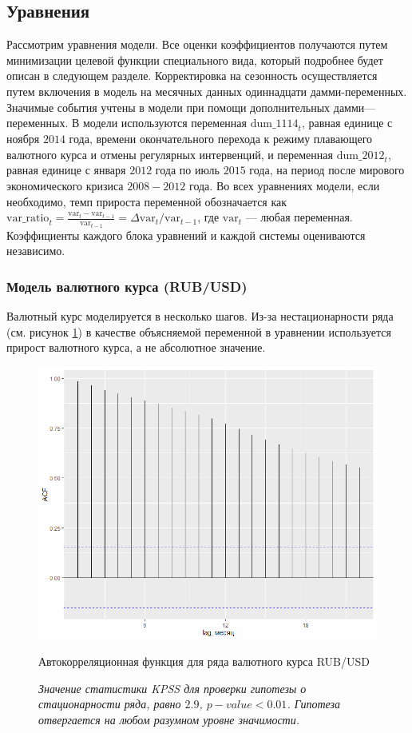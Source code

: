 \documentclass[a4paper, 14pt]{extarticle}
\begin{document}
\subsection{Уравнения}
Рассмотрим уравнения модели.
Все оценки коэффициентов получаются путем минимизации целевой функции специального вида, который подробнее будет описан в следующем разделе.
Корректировка на сезонность осуществляется путем включения в модель на месячных данных одиннадцати дамми-переменных.
Значимые события учтены в модели при помощи дополнительных дамми—переменных.
В модели используются переменная $\text{dum\_1114}_t$, равная единице с ноября $2014$ года, времени окончательного перехода к режиму плавающего валютного курса и отмены регулярных интервенций,  и переменная $\text{dum\_2012}_t$, равная единице с января $2012$ года по июль $2015$ года, на период после мирового экономического кризиса $2008-2012$ года.
Во всех уравнениях модели, если необходимо, темп прироста переменной обозначается как $\text{var\_ratio}_{t} = \frac{\text{var}_t -\text{var}_{t-1}}{\text{var}_{t-1}} = \Delta \text{var}_t / \text{var}_{t-1}$, где $\text{var}_{t}$ — любая переменная.
Коэффициенты каждого блока уравнений и каждой системы оцениваются независимо.

\subsubsection{Модель валютного курса (RUB/USD)}

Валютный курс моделируется в несколько шагов. 
Из-за нестационарности ряда (см. рисунок \ref{fi:2}) в качестве объясняемой переменной в уравнении используется прирост валютного курса, а не абсолютное значение.

\vspace{2cm}

\begin{figure}[htp!]
	\centering
	\includegraphics[width=14cm]{acf_rub_usd.png}
	\caption{Автокорреляционная функция для ряда валютного курса RUB/USD}\label{fi:2}
	\captionsetup{justification=centering,margin=0.5cm}
	\caption*{\textit{Значение статистики KPSS для проверки гипотезы о стационарности ряда, равно $2.9$, $p-value <0.01$. Гипотеза отвергается на любом разумном уровне значимости.}}
\end{figure}
\end{document}

